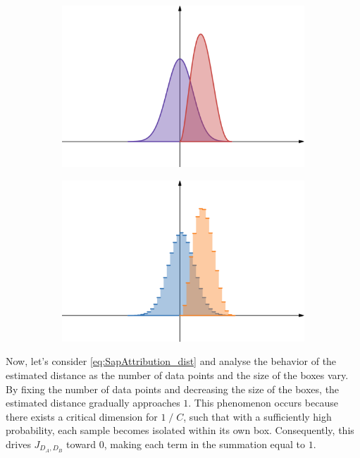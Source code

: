 \begin{figure}[ht]
	\centering
	\begin{subfigure}{0.45\linewidth}
		\includegraphics[width=\linewidth]{Figures/exnmodel_AB_cont.png}
	\end{subfigure} \begin{subfigure}{0.45\linewidth}
		\includegraphics[width=\linewidth]{Figures/exnmodel_AB_disc.png}
	\end{subfigure}
\end{figure}

\noindent Now, let’s consider \cref{eq:SapAttribution_dist} and analyse the behavior of the estimated distance as the number of data points and the size of the boxes vary. By fixing the number of data points and decreasing the size of the boxes, the estimated distance gradually approaches $1$. This phenomenon occurs because there exists a critical dimension for $1 \;/ \; C$, such that with a sufficiently high probability, each sample becomes isolated within its own box. Consequently, this drives $J_{D_A,D_B}$ toward $0$, making each term in the summation equal to $1$.

